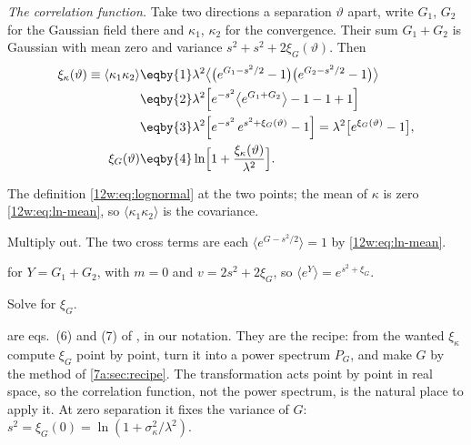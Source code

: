 \emph{The correlation function.} Take two directions a separation $\vartheta$ apart, write $G_1$, $G_2$ for the
Gaussian field there and $\kappa_1$, $\kappa_2$ for the convergence. Their sum $G_1+G_2$ is Gaussian with mean zero
and variance $s^2+s^2+2\xi_G(\vartheta)$. Then
\begin{align}
\xi_\kappa(\vartheta)\equiv\langle\kappa_1\kappa_2\rangle
&\eqby{1}\lambda^2\bigl\langle\bigl(e^{G_1-s^2/2}-1\bigr)\bigl(e^{G_2-s^2/2}-1\bigr)\bigr\rangle
\nonumber\\
&\eqby{2}\lambda^2\Bigl[e^{-s^2}\bigl\langle e^{G_1+G_2}\bigr\rangle-1-1+1\Bigr]
\nonumber\\
&\eqby{3}\lambda^2\Bigl[e^{-s^2}\,e^{s^2+\xi_G(\vartheta)}-1\Bigr]
=\lambda^2\bigl[e^{\xi_G(\vartheta)}-1\bigr],
\label{12w:eq:ln-xi}\\
\xi_G(\vartheta)&\eqby{4}\ln\Bigl[1+\frac{\xi_\kappa(\vartheta)}{\lambda^2}\Bigr].
\label{12w:eq:ln-xig}
\end{align}
\begin{explain}
  \item The definition \eqref{12w:eq:lognormal} at the two points; the mean of $\kappa$ is zero
        \eqref{12w:eq:ln-mean}, so $\langle\kappa_1\kappa_2\rangle$ is the covariance.
  \item Multiply out. The two cross terms are each $\langle e^{G-s^2/2}\rangle=1$ by \eqref{12w:eq:ln-mean}.
  \item {} for $Y=G_1+G_2$, with $m=0$ and $v=2s^2+2\xi_G$, so $\langle e^Y\rangle=e^{s^2+\xi_G}$.
  \item Solve for $\xi_G$.
\end{explain}
 are eqs.~(6) and (7) of \cite{Xavier2016}, in our notation. They are the
recipe: from the wanted $\xi_\kappa$ compute $\xi_G$ point by point, turn it into a power spectrum $P_G$, and make
$G$ by the method of \cref{7a:sec:recipe}. The transformation acts point by point in real space, so the correlation
function, not the power spectrum, is the natural place to apply it. At zero separation it fixes the variance of
$G$: $s^2=\xi_G(0)=\ln(1+\sigma_\kappa^2/\lambda^2)$.

